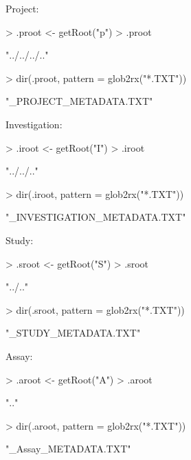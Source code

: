 \documentclass[a4paper,12pt]{article}\usepackage[]{graphicx}\usepackage[]{color}
\begin{document}
Project:
\begin{Schunk}
\begin{Sinput}
> .proot <- getRoot("p")
> .proot
\end{Sinput}
\begin{Soutput}
[1] "../../../.."
\end{Soutput}
\begin{Sinput}
> dir(.proot, pattern = glob2rx("*.TXT"))
\end{Sinput}
\begin{Soutput}
[1] "_PROJECT_METADATA.TXT"
\end{Soutput}
\end{Schunk}

Investigation:
\begin{Schunk}
\begin{Sinput}
> .iroot <- getRoot("I")
> .iroot
\end{Sinput}
\begin{Soutput}
[1] "../../.."
\end{Soutput}
\begin{Sinput}
> dir(.iroot, pattern = glob2rx("*.TXT"))
\end{Sinput}
\begin{Soutput}
[1] "_INVESTIGATION_METADATA.TXT"
\end{Soutput}
\end{Schunk}

Study:
\begin{Schunk}
\begin{Sinput}
> .sroot <- getRoot("S")
> .sroot
\end{Sinput}
\begin{Soutput}
[1] "../.."
\end{Soutput}
\begin{Sinput}
> dir(.sroot, pattern = glob2rx("*.TXT"))
\end{Sinput}
\begin{Soutput}
[1] "_STUDY_METADATA.TXT"
\end{Soutput}
\end{Schunk}

Assay:
\begin{Schunk}
\begin{Sinput}
> .aroot <- getRoot("A")
> .aroot
\end{Sinput}
\begin{Soutput}
[1] ".."
\end{Soutput}
\begin{Sinput}
> dir(.aroot, pattern = glob2rx("*.TXT"))
\end{Sinput}
\begin{Soutput}
[1] "_Assay_METADATA.TXT"
\end{Soutput}
\end{Schunk}
\end{document}
